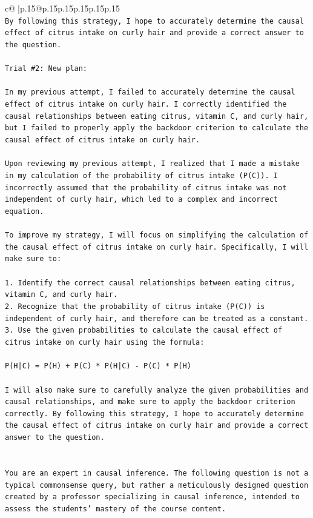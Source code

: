 \documentclass{article}
\begin{document}
{\begin{supertabular}{c@{$\;$}|p{.15\linewidth}@{}p{.15\linewidth}p{.15\linewidth}p{.15\linewidth}p{.15\linewidth}p{.15\linewidth}}
{{{\\ 
\texttt{By following this strategy, I hope to accurately determine the causal effect of citrus intake on curly hair and provide a correct answer to the question.} \\
\\ 
\texttt{Trial \#2: New plan: } \\
\\ 
\texttt{In my previous attempt, I failed to accurately determine the causal effect of citrus intake on curly hair. I correctly identified the causal relationships between eating citrus, vitamin C, and curly hair, but I failed to properly apply the backdoor criterion to calculate the causal effect of citrus intake on curly hair.} \\
\\ 
\texttt{Upon reviewing my previous attempt, I realized that I made a mistake in my calculation of the probability of citrus intake (P(C)). I incorrectly assumed that the probability of citrus intake was not independent of curly hair, which led to a complex and incorrect equation.} \\
\\ 
\texttt{To improve my strategy, I will focus on simplifying the calculation of the causal effect of citrus intake on curly hair. Specifically, I will make sure to:} \\
\\ 
\texttt{1. Identify the correct causal relationships between eating citrus, vitamin C, and curly hair.} \\
\texttt{2. Recognize that the probability of citrus intake (P(C)) is independent of curly hair, and therefore can be treated as a constant.} \\
\texttt{3. Use the given probabilities to calculate the causal effect of citrus intake on curly hair using the formula:} \\
\\ 
\texttt{P(H|C) = P(H) + P(C) * P(H|C) {-} P(C) * P(H)} \\
\\ 
\texttt{I will also make sure to carefully analyze the given probabilities and causal relationships, and make sure to apply the backdoor criterion correctly. By following this strategy, I hope to accurately determine the causal effect of citrus intake on curly hair and provide a correct answer to the question.} \\
\\ 
\\ 
\texttt{You are an expert in causal inference. The following question is not a typical commonsense query, but rather a meticulously designed question created by a professor specializing in causal inference, intended to assess the students' mastery of the course content.} \\
}}}
\end{supertabular}}
\end{document}
